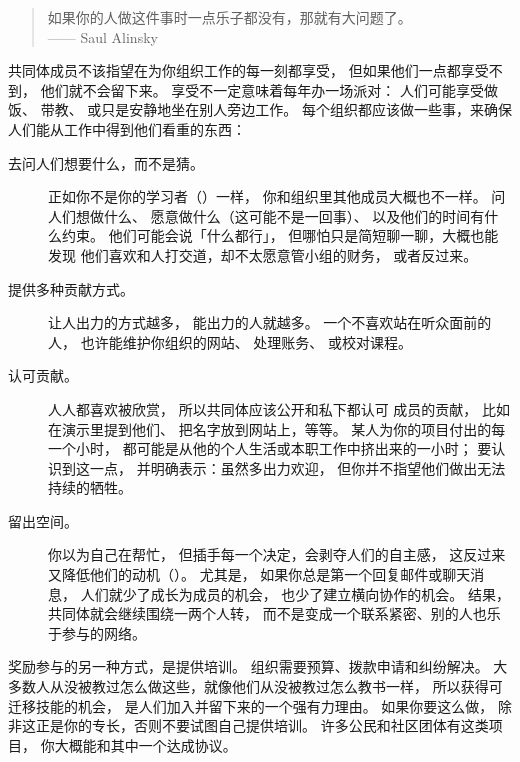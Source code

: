 
\begin{quote}

  如果你的人做这件事时一点乐子都没有，那就有大问题了。\\
  —— Saul Alinsky

\end{quote}

共同体成员不该指望在为你组织工作的每一刻都享受，
但如果他们一点都享受不到，
他们就不会留下来。
享受不一定意味着每年办一场派对：
人们可能享受做饭、
带教、
或只是安静地坐在别人旁边工作。
每个组织都应该做一些事，来确保
人们能从工作中得到他们看重的东西：

\begin{description}

\item[去问人们想要什么，而不是猜。]
  正如你不是你的学习者（）一样，
  你和组织里其他成员大概也不一样。
  问人们想做什么、
  愿意做什么（这可能不是一回事）、
  以及他们的时间有什么约束。
  他们可能会说「什么都行」，
  但哪怕只是简短聊一聊，大概也能发现
  他们喜欢和人打交道，却不太愿意管小组的财务，
  或者反过来。

\item[提供多种贡献方式。]
  让人出力的方式越多，
  能出力的人就越多。
  一个不喜欢站在听众面前的人，
  也许能维护你组织的网站、
  处理账务、
  或校对课程。

\item[认可贡献。]
  人人都喜欢被欣赏，
  所以共同体应该公开和私下都认可
  成员的贡献，
  比如在演示里提到他们、
  把名字放到网站上，等等。
  某人为你的项目付出的每一个小时，
  都可能是从他的个人生活或本职工作中挤出来的一小时；
  要认识到这一点，
  并明确表示：虽然多出力欢迎，
  但你并不指望他们做出无法持续的牺牲。

\item[留出空间。]
  你以为自己在帮忙，
  但插手每一个决定，会剥夺人们的自主感，
  这反过来又降低他们的动机（）。
  尤其是，
  如果你总是第一个回复邮件或聊天消息，
  人们就少了成长为成员的机会，
  也少了建立横向协作的机会。
  结果，
  共同体就会继续围绕一两个人转，
  而不是变成一个联系紧密、别的人也乐于参与的网络。

\end{description}

奖励参与的另一种方式，是提供培训。
组织需要预算、拨款申请和纠纷解决。
大多数人从没被教过怎么做这些，就像他们从没被教过怎么教书一样，
所以获得可迁移技能的机会，
是人们加入并留下来的一个强有力理由。
如果你要这么做，
除非这正是你的专长，否则不要试图自己提供培训。
许多公民和社区团体有这类项目，
你大概能和其中一个达成协议。

